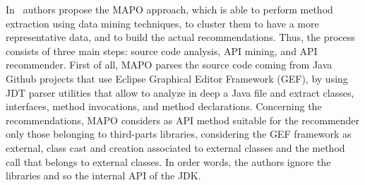 In~\cite{zhong_mapo:_2009} authors propose 
the MAPO approach, which is able to 
perform method extraction using data mining 
techniques, to cluster them to have 
a more representative data, and to build 
the actual recommendations. Thus, the 
process consists of three main steps: 
source code analysis, API mining, and API 
recommender. First of all, MAPO parses the 
source code coming from Java Github 
projects that use Eclipse Graphical Editor 
Framework (GEF), by using JDT parser 
utilities that allow to analyze in deep a 
Java file and extract classes, 
interfaces, method invocations, and method 
declarations. Concerning the 
recommendations, MAPO considers as API 
method suitable for the recommender only 
those belonging to third-parts libraries, 
considering the GEF framework as 
external, class cast and creation 
associated to external classes and the 
method 
call that belongs to external classes. In 
order words, the authors ignore the 
libraries and so the internal API of the 
JDK. 


